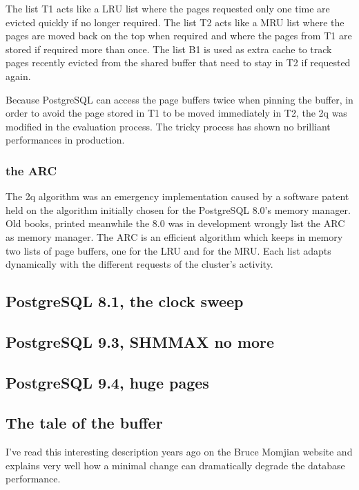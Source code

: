 The list T1 acts like a LRU list where the pages requested only one time are evicted quickly if no longer required. 
The list T2 acts like a MRU list where the pages are moved back on the top when required and where the pages from 
T1 are stored if required more than once. The list B1 is used as extra cache to track pages recently evicted from 
the shared buffer that need to stay in T2 if requested again.\newline

Because PostgreSQL can access the page buffers twice when pinning the buffer, in order to avoid the page stored in 
T1 to be moved immediately in T2, the 2q was modified in the evaluation process. The tricky process has shown no 
brilliant performances in production.


\subsubsection{the ARC}
The 2q algorithm was an emergency implementation caused by a software patent held on the algorithm initially 
chosen for the PostgreSQL 8.0's memory manager. Old books, printed meanwhile the 8.0 was in development 
wrongly list the ARC as memory manager. The ARC is an efficient algorithm which keeps in memory two 
lists of page buffers, one for the LRU and for the MRU. Each list adapts dynamically with the different requests 
of the cluster's activity. 

\subsection{PostgreSQL 8.1, the clock sweep}

\subsection{PostgreSQL 9.3, SHMMAX no more}

\subsection{PostgreSQL 9.4, huge pages}

\subsection{The tale of the buffer}
I've read this interesting description years ago on the Bruce Momjian website and explains very well how a 
minimal change can dramatically degrade the database performance.\newline

